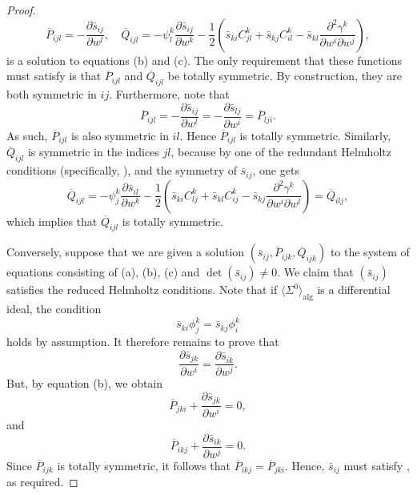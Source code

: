 \documentclass[11pt]{article}
\theoremstyle{plain}
\theoremstyle{definition}
\begin{document}
\begin{proof}
\begin{equation*}
    \overline{P}_{ijl}=-\frac{\partial \bar{s}_{ij}}{\partial w^l},\quad \overline{Q}_{ijl}=-\psi_l^k \frac{\partial \bar{s}_{ij}}{\partial w^k}-\frac{1}{2}\left(\bar{s}_{ki}C_{jl}^k+\bar{s}_{kj}C_{il}^k-\bar{s}_{kl}\frac{\partial^2 \gamma^k}{\partial w^i \partial w^j}\right),
\end{equation*}
is a solution to equations (b) and (c). The only requirement that these functions must satisfy is that $\overline{P}_{ijl}$ and $\overline{Q}_{ijl}$ be totally symmetric. By construction, they are both symmetric in $ij$. Furthermore, note that
\begin{equation*}
    \overline{P}_{ijl}=-\frac{\partial \bar{s}_{ij}}{\partial w^l}=-\frac{\partial \bar{s}_{lj}}{\partial w^i}=\overline{P}_{lji}.
\end{equation*}
As such, $\overline{P}_{ijl}$ is also symmetric in $il$. Hence $\overline{P}_{ijl}$ is totally symmetric. Similarly, $\overline{Q}_{ijl}$ is symmetric in the indices $jl$, because by one of the redundant Helmholtz conditions (specifically, ), and the symmetry of $\bar{s}_{ij}$, one gets
\begin{equation*}
    \overline{Q}_{ijl}=-\psi_j^k \frac{\partial \bar{s}_{il}}{\partial w^k}-\frac{1}{2}\left(\bar{s}_{ki}C_{lj}^k+\bar{s}_{kl}C_{ij}^k-\bar{s}_{kj}\frac{\partial^2 \gamma^k}{\partial w^i \partial w^l}\right)=\overline{Q}_{ilj},
\end{equation*}
which implies that $\overline{Q}_{ijl}$ is totally symmetric.

Conversely, suppose that we are given a solution $(\bar{s}_{ij},\overline{P}_{ijk}, \overline{Q}_{ijk})$ to the system of equations consisting of (a), (b), (c) and $\det(\bar{s}_{ij})\neq 0$. We claim that $(\bar{s}_{ij})$ satisfies the reduced Helmholtz conditions. Note that if $\langle \Sigma^0\rangle_{\mathrm{alg}}$ is a differential ideal, the condition
\begin{equation*}
    \bar{s}_{ki}\phi_j^k=\bar{s}_{kj}\phi_i^k
\end{equation*}
holds by assumption. It therefore remains to prove that
\begin{equation}\label{eqn:helmholtzDV}
    \frac{\partial \bar{s}_{jk}}{\partial w^i}=\frac{\partial \bar{s}_{ik}}{\partial w^j}.
\end{equation}
But, by equation (b), we obtain
\begin{equation*}
    \overline{P}_{jki}+\frac{\partial \bar{s}_{jk}}{\partial w^i}=0,
\end{equation*}
and
\begin{equation*}
    \overline{P}_{ikj}+\frac{\partial \bar{s}_{ik}}{\partial w^j}=0.
\end{equation*}
Since $\overline{P}_{ijk}$ is totally symmetric, it follows that $\overline{P}_{ikj}=\overline{P}_{jki}$. Hence, $\bar{s}_{ij}$ must satisfy , as required.
\end{proof}
\end{document}
